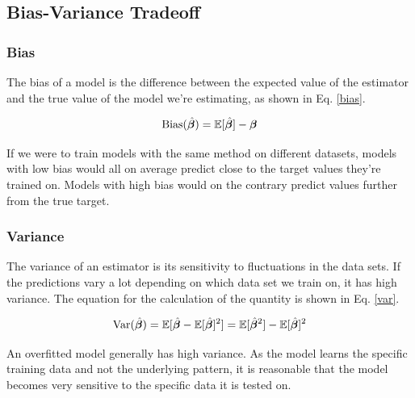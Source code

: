 \subsection{Bias-Variance Tradeoff}


\subsubsection{Bias}
The bias of a model is the difference between the expected value of the estimator and the true value of the model we're estimating, as shown in Eq. \ref{bias}. 

\begin{equation}\label{bias}
    \text{Bias}(\hat{\boldsymbol{\beta}}) = \mathbb{E}[\hat{\boldsymbol{\beta}}]-\boldsymbol{\beta}
\end{equation}

If we were to train models with the same method on different datasets, models with low bias would all on average predict close to the target values they're trained on. Models with high bias would on the contrary predict values further from the true target.

\subsubsection{Variance}

The variance of an estimator is its sensitivity to fluctuations in the data sets. If the predictions vary a lot depending on which data set we train on, it has high variance. The equation for the calculation of the quantity is shown in Eq. \ref{var}. 

\begin{equation}\label{var}
    \text{Var}(\hat{\boldsymbol{\beta}}) = \mathbb{E}[\hat{\boldsymbol{\beta}}-\mathbb{E}[\hat{\boldsymbol{\beta}}]^2] = \mathbb{E}[\hat{\boldsymbol{\beta}}^2] - \mathbb{E}[\hat{\boldsymbol{\beta}}]^2
\end{equation}

An overfitted model generally has high variance. As the model learns the specific training data and not the underlying pattern, it is reasonable that the model becomes very sensitive to the specific data it is tested on.

